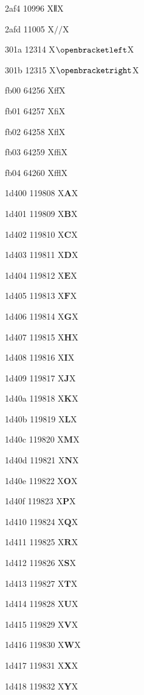 \documentclass[11pt]{article}
\begin{document}
2af4 10996 X{\ensuremath{\interleave}}X

2afd 11005 X{\ensuremath{{/}\!\!{/}}}X

301a 12314 X{\ensuremath{\openbracketleft}}X

301b 12315 X{\ensuremath{\openbracketright}}X

fb00 64256 X{ff}X

fb01 64257 X{fi}X

fb02 64258 X{fl}X

fb03 64259 X{ffi}X

fb04 64260 X{ffl}X

1d400 119808 X{\ensuremath{\mathbf{A}}}X

1d401 119809 X{\ensuremath{\mathbf{B}}}X

1d402 119810 X{\ensuremath{\mathbf{C}}}X

1d403 119811 X{\ensuremath{\mathbf{D}}}X

1d404 119812 X{\ensuremath{\mathbf{E}}}X

1d405 119813 X{\ensuremath{\mathbf{F}}}X

1d406 119814 X{\ensuremath{\mathbf{G}}}X

1d407 119815 X{\ensuremath{\mathbf{H}}}X

1d408 119816 X{\ensuremath{\mathbf{I}}}X

1d409 119817 X{\ensuremath{\mathbf{J}}}X

1d40a 119818 X{\ensuremath{\mathbf{K}}}X

1d40b 119819 X{\ensuremath{\mathbf{L}}}X

1d40c 119820 X{\ensuremath{\mathbf{M}}}X

1d40d 119821 X{\ensuremath{\mathbf{N}}}X

1d40e 119822 X{\ensuremath{\mathbf{O}}}X

1d40f 119823 X{\ensuremath{\mathbf{P}}}X

1d410 119824 X{\ensuremath{\mathbf{Q}}}X

1d411 119825 X{\ensuremath{\mathbf{R}}}X

1d412 119826 X{\ensuremath{\mathbf{S}}}X

1d413 119827 X{\ensuremath{\mathbf{T}}}X

1d414 119828 X{\ensuremath{\mathbf{U}}}X

1d415 119829 X{\ensuremath{\mathbf{V}}}X

1d416 119830 X{\ensuremath{\mathbf{W}}}X

1d417 119831 X{\ensuremath{\mathbf{X}}}X

1d418 119832 X{\ensuremath{\mathbf{Y}}}X
\end{document}
